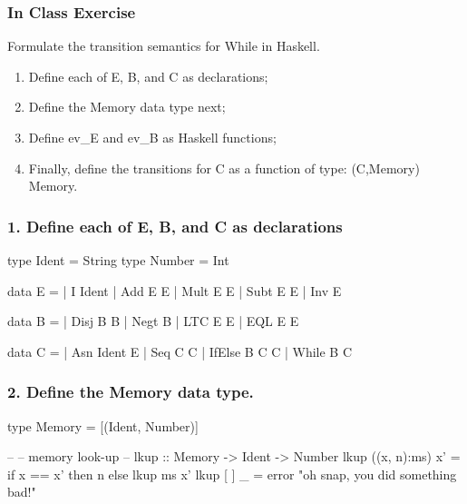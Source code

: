 \documentclass{beamer}
\begin{document}
\frame
{
\frametitle{In Class Exercise}

Formulate the transition semantics for While in Haskell.

\begin{enumerate}

\item Define each of E, B, and C as \<\> declarations;

\item Define the Memory data type next;

\item Define \<ev_E\> and \<ev_B\> as Haskell functions;

\item Finally, define the transitions for C as a function of type: \<(C,Memory) \ra Memory\>.

\end{enumerate}

}

\begin{frame}[fragile]
\frametitle{1. Define each of E, B, and C as \<\> declarations}

\begin{smallcode}
type Ident  = String
type Number = Int%

data E = %
       | I Ident
       | Add E E | Mult E E | Subt E E | Inv E

data B = %
       | Disj B B | Negt B | LTC E E | EQL E E

data C = %
       | Asn Ident E
       | Seq C C
       | IfElse B C C | While B C
\end{smallcode}

\end{frame}


\begin{frame}[fragile]
\frametitle{2. Define the Memory data type.}

\begin{smallcode}
type Memory = [(Ident, Number)]

--
-- memory look-up
--
lkup :: Memory -> Ident -> Number
lkup ((x, n):ms) x' = if x == x' then n else lkup ms x'
lkup [ ] _          = error "oh snap, you did something bad!"

\end{smallcode}

\end{frame}
\end{document}
